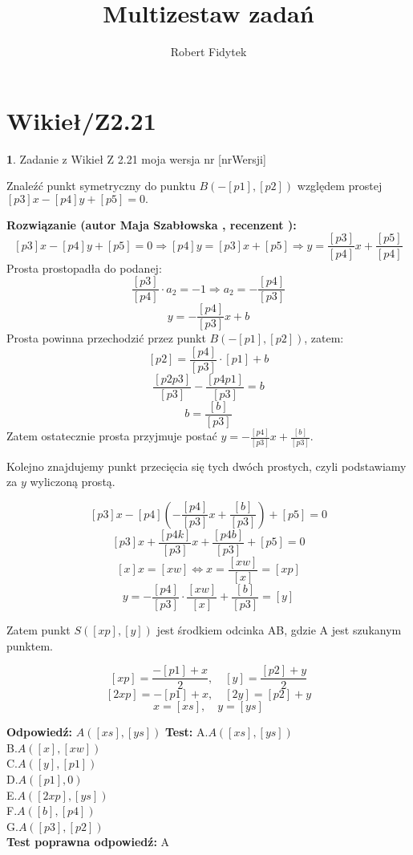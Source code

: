 \documentclass[12pt, a4paper]{article}
\title{Multizestaw zadań}
\author{Robert Fidytek}
\date{}
\theoremstyle{definition} %
\newtheorem{zad}{}
\newcommand{\kategoria}[1]{\section{#1}} %
\newcommand{\zadStart}[1]{\begin{zad}#1\newline} %
\newcommand{\zadStop}{\end{zad}}   %
\newcommand{\rozwStart}[2]{\noindent \textbf{Rozwiązanie (autor #1 , recenzent #2): }\newline} %
\newcommand{\rozwStop}{\newline}                                            %
\newcommand{\odpStart}{\noindent \textbf{Odpowiedź:}\newline}    %
\newcommand{\odpStop}{\newline}                                             %
\newcommand{\testStart}{\noindent \textbf{Test:}\newline} %
\newcommand{\testStop}{\newline} %
\newcommand{\kluczStart}{\noindent \textbf{Test poprawna odpowiedź:}\newline} %
\newcommand{\kluczStop}{\newline} %
\begin{document}
\maketitle


\kategoria{Wikieł/Z2.21}
\zadStart{Zadanie z Wikieł Z 2.21  moja wersja nr [nrWersji]}

Znaleźć punkt symetryczny do punktu $B(-[p1],[p2])$ względem prostej $[p3]x-[p4]y+[p5]=0.$
\zadStop

\rozwStart{Maja Szabłowska}{}
$$[p3]x-[p4]y+[p5]=0 \Rightarrow [p4]y=[p3]x+[p5] \Rightarrow y=\frac{[p3]}{[p4]}x+\frac{[p5]}{[p4]}$$
Prosta prostopadła do podanej:
$$\frac{[p3]}{[p4]}\cdot a_{2}=-1 \Rightarrow a_{2}=-\frac{[p4]}{[p3]}$$
 $$y=-\frac{[p4]}{[p3]}x+b$$
 Prosta powinna przechodzić przez punkt $B(-[p1],[p2])$, zatem:
 $$[p2]=\frac{[p4]}{[p3]}\cdot [p1] +b$$
 $$\frac{[p2p3]}{[p3]}-\frac{[p4p1]}{[p3]}=b$$
 $$b=\frac{[b]}{[p3]}$$
 Zatem ostatecznie prosta przyjmuje postać $y=-\frac{[p4]}{[p3]}x+\frac{[b]}{[p3]}.$
 
Kolejno znajdujemy punkt przecięcia się tych dwóch prostych, czyli podstawiamy za $y$ wyliczoną prostą.

$$[p3]x-[p4]\left(-\frac{[p4]}{[p3]}x+\frac{[b]}{[p3]}\right)+[p5]=0$$
$$[p3]x+\frac{[p4k]}{[p3]}x+\frac{[p4b]}{[p3]}+[p5]=0$$
$$[x]x=[xw] \iff x=\frac{[xw]}{[x]}=[xp]$$
$$y=-\frac{[p4]}{[p3]}\cdot\frac{[xw]}{[x]}+\frac{[b]}{[p3]}=[y]$$

Zatem punkt $S([xp],[y])$ jest środkiem odcinka AB, gdzie A jest szukanym punktem.

$$[xp]=\frac{-[p1]+x}{2}, \quad [y]=\frac{[p2]+y}{2}$$
$$[2xp]=-[p1]+x, \quad [2y]=[p2]+y$$
$$x=[xs], \quad y=[ys]$$

\rozwStop


\odpStart
$A([xs],[ys])$
\odpStop
\testStart
A.$A([xs],[ys])$\\
B.$A([x],[xw])$\\
C.$A([y],[p1])$\\
D.$A([p1],0)$\\
E.$A([2xp],[ys])$\\
F.$A([b],[p4])$\\
G.$A([p3],[p2])$\\
\testStop
\kluczStart
A
\kluczStop
\end{document}
